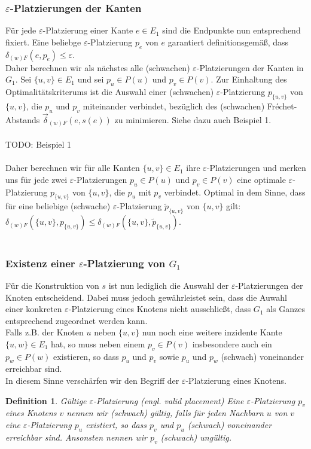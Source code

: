 \documentclass[a4paper, 12pt, twoside]{article}
\theoremstyle{Format1} %
\newtheorem{Def}{Definition}[section]       %
\begin{document}
\subsubsection{$\varepsilon$-Platzierungen der Kanten}
Für jede $\varepsilon$-Platzierung einer Kante $e \in E_1$ sind die Endpunkte nun entsprechend fixiert.
Eine beliebge $\varepsilon$-Platzierung $p_e$ von $e$ garantiert definitionsgemäß, dass $\delta_{(w)F}(e, p_e) \leq \varepsilon$.
\\
Daher berechnen wir als nächstes alle (schwachen) $\varepsilon$-Platzierungen der Kanten in $G_1$.
Sei $\{u,v\} \in E_1$ und sei $p_u \in P(u)$ und $p_v \in P(v)$.
Zur Einhaltung des Optimalitätskriterums ist die Auswahl einer (schwachen) $\varepsilon$-Platzierung $p_{\{u,v\}}$ von $\{u,v\}$,
die $p_u$ und $p_v$ miteinander verbindet, bezüglich des (schwachen) Fréchet-Abstands $\vec{\delta}_{(w)F}(e, s(e))$ zu minimieren.
Siehe dazu auch Beispiel 1.
\\
\\
TODO: Beispiel 1
\\
\\
Daher berechnen wir für alle Kanten $\{u, v\} \in E_1$ ihre $\varepsilon$-Platzierungen und merken uns für jede zwei $\varepsilon$-Platzierungen
$p_u \in P(u)$ und $p_v \in P(v)$ eine optimale $\varepsilon$-Platzierung $p_{\{u,v\}}$ von $\{u,v\}$, die $p_u$ mit $p_v$ verbindet.
Optimal in dem Sinne, dass für eine beliebige (schwache) $\varepsilon$-Platzierung $\tilde{p}_{\{u,v\}}$ von $\{u,v\}$ gilt:
$\delta_{(w)F}(\{u,v\}, p_{\{u,v\}}) \leq \delta_{(w)F}(\{u,v\}, \tilde{p}_{\{u,v\}})$.
\\
\\
\subsubsection{Existenz einer $\varepsilon$-Platzierung von $G_1$}
Für die Konstruktion von $s$ ist nun lediglich die Auswahl der $\varepsilon$-Platzierungen der Knoten entscheidend.
Dabei muss jedoch gewährleistet sein, dass die Auwahl einer konkreten $\varepsilon$-Platzierung eines Knotens nicht ausschließt, dass $G_1$ als Ganzes
entsprechend zugeordnet werden kann.
\\
Falls z.B. der Knoten $u$ neben $\{u,v\}$ nun noch eine weitere inzidente Kante $\{u,w\} \in E_1$ hat, so muss neben einem $p_v \in P(v)$ insbesondere auch
ein $p_w \in P(w)$ existieren, so dass $p_u$ und $p_v$ sowie $p_u$ und $p_w$ (schwach) voneinander erreichbar sind.
\\
In diesem Sinne verschärfen wir den Begriff der $\varepsilon$-Platzierung eines Knotens.
\begin{Def}
	Gültige $\varepsilon$-Platzierung (engl. valid placement)
	Eine $\varepsilon$-Platzierung $p_v$ eines Knotens $v$ nennen wir (schwach) gültig, falls für jeden Nachbarn $u$ von $v$
	eine $\varepsilon$-Platzierung $p_u$ existiert, so dass $p_v$ und $p_u$ (schwach) voneinander erreichbar sind.
	Ansonsten nennen wir $p_v$ (schwach) ungültig.
\end{Def}
\end{document}
